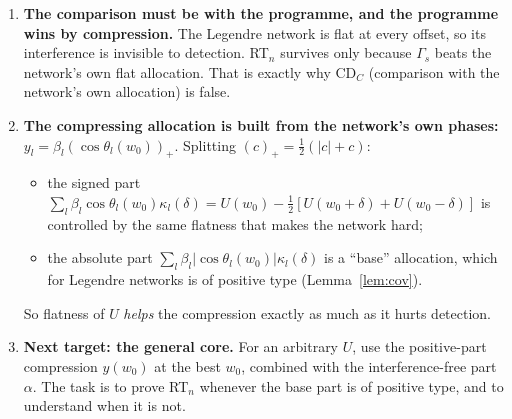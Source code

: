 \documentclass[11pt]{article}
\theoremstyle{remark}\newtheorem{remark}[theorem]{Remark}
\begin{document}
\begin{enumerate}
\item \textbf{The comparison must be with the programme, and the programme wins by compression.} The Legendre network is
flat at every offset, so its interference is invisible to detection. RT$_n$ survives only because $\Gamma_s$ beats the
network's own flat allocation. That is exactly why CD$_C$ (comparison with the network's own allocation) is false.
\item \textbf{The compressing allocation is built from the network's own phases:} $y_l=\beta_l(\cos\theta_l(w_0))_+$.
Splitting $(c)_+=\tfrac12(|c|+c)$:
\begin{itemize}
\item the signed part $\sum_l\beta_l\cos\theta_l(w_0)\kappa_l(\delta)=U(w_0)-\tfrac12[U(w_0+\delta)+U(w_0-\delta)]$ is
controlled by the same flatness that makes the network hard;
\item the absolute part $\sum_l\beta_l|\cos\theta_l(w_0)|\kappa_l(\delta)$ is a ``base'' allocation, which for Legendre
networks is of positive type (Lemma~\ref{lem:cov}).
\end{itemize}
So flatness of $U$ \emph{helps} the compression exactly as much as it hurts detection.
\item \textbf{Next target: the general core.} For an arbitrary $U$, use the positive-part compression $y(w_0)$ at the best
$w_0$, combined with the interference-free part $\alpha$. The task is to prove RT$_n$ whenever the base part is of
positive type, and to understand when it is not.
\end{enumerate}
\end{document}
